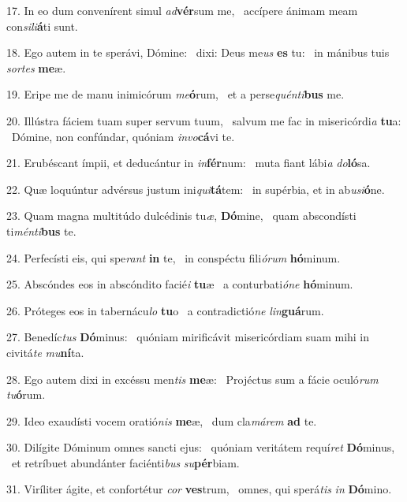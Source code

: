 17. In eo dum convenírent simul \textit{ad}\textbf{vér}sum me, \ast\  accípere ánimam meam con\textit{si}\textit{li}\textbf{á}ti sunt.\

18. Ego autem in te sperávi, Dómine: \dag\  dixi: Deus me\textit{us} \textbf{es} tu: \ast\  in mánibus tuis \textit{sor}\textit{tes} \textbf{me}æ.\

19. Eripe me de manu inimicórum \textit{me}\textbf{ó}rum, \ast\  et a perse\textit{quén}\textit{ti}\textbf{bus} me.\

20. Illústra fáciem tuam super servum tuum, \dag\  salvum me fac in misericórdi\textit{a} \textbf{tu}a: \ast\  Dómine, non confúndar, quóniam \textit{in}\textit{vo}\textbf{cá}vi te.\

21. Erubéscant ímpii, et deducántur in \textit{in}\textbf{fér}num: \ast\  muta fiant lábi\textit{a} \textit{do}\textbf{ló}sa.\

22. Quæ loquúntur advérsus justum ini\textit{qui}\textbf{tá}tem: \ast\  in supérbia, et in ab\textit{u}\textit{si}\textbf{ó}ne.\

23. Quam magna multitúdo dulcédinis tu\textit{æ}, \textbf{Dó}mine, \ast\  quam abscondísti ti\textit{mén}\textit{ti}\textbf{bus} te.\

24. Perfecísti eis, qui spe\textit{rant} \textbf{in} te, \ast\  in conspéctu fili\textit{ó}\textit{rum} \textbf{hó}minum.\

25. Abscóndes eos in abscóndito facié\textit{i} \textbf{tu}æ \ast\  a conturbati\textit{ó}\textit{ne} \textbf{hó}minum.\

26. Próteges eos in tabernácu\textit{lo} \textbf{tu}o \ast\  a contradictió\textit{ne} \textit{lin}\textbf{guá}rum.\

27. Benedíc\textit{tus} \textbf{Dó}minus: \ast\  quóniam mirificávit misericórdiam suam mihi in civitá\textit{te} \textit{mu}\textbf{ní}ta.\

28. Ego autem dixi in excéssu men\textit{tis} \textbf{me}æ: \ast\  Projéctus sum a fácie oculó\textit{rum} \textit{tu}\textbf{ó}rum.\

29. Ideo exaudísti vocem oratió\textit{nis} \textbf{me}æ, \ast\  dum cla\textit{má}\textit{rem} \textbf{ad} te.\

30. Dilígite Dóminum omnes sancti ejus: \dag\  quóniam veritátem requí\textit{ret} \textbf{Dó}minus, \ast\  et retríbuet abundánter faciénti\textit{bus} \textit{su}\textbf{pér}biam.\

31. Viríliter ágite, et confortétur \textit{cor} \textbf{ves}trum, \ast\  omnes, qui sperá\textit{tis} \textit{in} \textbf{Dó}mino.\

